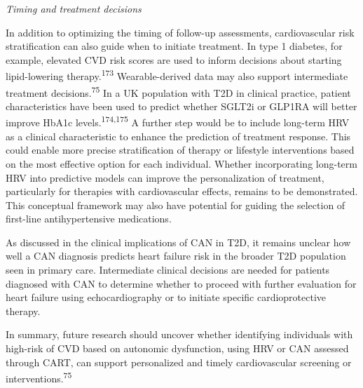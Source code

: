 \documentclass[
  a4paper,
  headsepline=true,
  open=any]{scrbook}
\begin{document}
\emph{Timing and treatment decisions}

In addition to optimizing the timing of follow-up assessments,
cardiovascular risk stratification can also guide when to initiate
treatment. In type 1 diabetes, for example, elevated CVD risk scores are
used to inform decisions about starting lipid-lowering
therapy.\textsuperscript{173} Wearable-derived data may also support
intermediate treatment decisions.\textsuperscript{75} In a UK population
with T2D in clinical practice, patient characteristics have been used to
predict whether SGLT2i or GLP1RA will better improve HbA1c
levels.\textsuperscript{174,175} A further step would be to include
long-term HRV as a clinical characteristic to enhance the prediction of
treatment response. This could enable more precise stratification of
therapy or lifestyle interventions based on the most effective option
for each individual. Whether incorporating long-term HRV into predictive
models can improve the personalization of treatment, particularly for
therapies with cardiovascular effects, remains to be demonstrated. This
conceptual framework may also have potential for guiding the selection
of first-line antihypertensive medications.

As discussed in the clinical implications of CAN in T2D, it remains
unclear how well a CAN diagnosis predicts heart failure risk in the
broader T2D population seen in primary care. Intermediate clinical
decisions are needed for patients diagnosed with CAN to determine
whether to proceed with further evaluation for heart failure using
echocardiography or to initiate specific cardioprotective therapy.

In summary, future research should uncover whether identifying
individuals with high-risk of CVD based on autonomic dysfunction, using
HRV or CAN assessed through CART, can support personalized and timely
cardiovascular screening or interventions.\textsuperscript{75}
\end{document}
